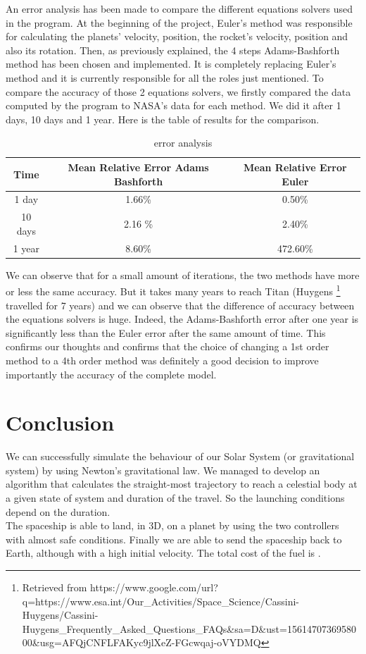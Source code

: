 \documentclass[10pt,a4paper]{article}
\begin{document}
	An error analysis has been made to compare the different equations solvers used in the program. At the beginning of the project, Euler's method was responsible for calculating the planets' velocity, position, the rocket's velocity, position and also its rotation. Then, as previously explained, the 4 steps Adams-Bashforth method has been chosen and implemented. It is completely replacing Euler's method and it is currently responsible for all the roles just mentioned. To compare the accuracy of those 2 equations solvers, we firstly compared the data computed by the program to NASA's data for each method. We did it after 1 days, 10 days and 1 year. Here is the table of results for the comparison.
	\begin{table}[h]
		\begin{center}
			\begin{tabular}{|c||c|c|}        
				\hline
				Time &    Mean Relative Error Adams Bashforth & Mean Relative Error Euler \\
				\hline \hline
				1 day & 1.66\% & 0.50\% \\
				\hline
				10 days & 2.16 \% & 2.40\% \\
				\hline
				1 year & 8.60\% & 472.60\% \\
				\hline                
			\end{tabular}
			\caption{error analysis}
		\end{center}
	\end{table}
	
	We can observe that for a small amount of iterations, the two methods have more or less the same accuracy. But it takes many years to reach Titan (Huygens \footnote{Retrieved from https://www.google.com/url?q=https://www.esa.int/Our\_Activities/Space\_Science/Cassini-Huygens/Cassini-Huygens\_Frequently\_Asked\_Questions\_FAQs\&sa=D\&ust=1561470736958000\&usg=AFQjCNFLFAKyc9jlXeZ-FGcwqaj-oVYDMQ}
	travelled for 7 years) and we can observe that the difference of accuracy between the equations solvers is huge. Indeed, the Adams-Bashforth error after one year is significantly less than the Euler error after the same amount of time. This confirms our thoughts and confirms that the choice of changing a 1st order method to a 4th order method was definitely a good decision to improve importantly the accuracy of the complete model.
	
	
	\section{Conclusion}
	We can successfully simulate the behaviour of our Solar System (or gravitational system) by using Newton's gravitational law. We managed to develop an algorithm that calculates the straight-most trajectory to reach a celestial body at a given state of system and duration of the travel. So the launching conditions depend on the duration.\\
	The spaceship is able to land, in 3D, on a planet by using the two controllers with almost safe conditions.
	Finally we are able to send the spaceship back to Earth, although with a high initial velocity.
	The total cost of the fuel is .\\
	
\end{document}
